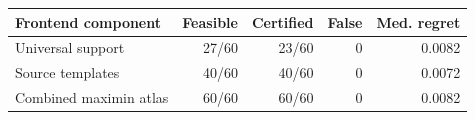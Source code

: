 \begin{tabular}{lrrrr}
\toprule
Frontend component & Feasible & Certified & False & Med. regret \\
\midrule
Universal support & 27/60 & 23/60 & 0 & 0.0082 \\
Source templates & 40/60 & 40/60 & 0 & 0.0072 \\
Combined maximin atlas & 60/60 & 60/60 & 0 & 0.0082 \\
\bottomrule
\end{tabular}
